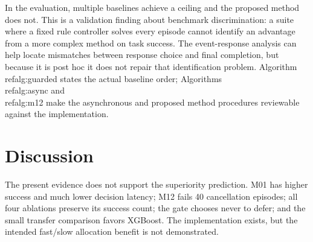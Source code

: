 \documentclass[11pt]{article}
\begin{document}
In the evaluation, multiple baselines achieve a ceiling and the proposed method does not. This is a validation finding about benchmark discrimination: a suite where a fixed rule controller solves every episode cannot identify an advantage from a more complex method on task success. The event-response analysis can help locate mismatches between response choice and final completion, but because it is post hoc it does not repair that identification problem. Algorithm~\\ref{alg:guarded} states the actual baseline order; Algorithms~\\ref{alg:async} and~\\ref{alg:m12} make the asynchronous and proposed method procedures reviewable against the implementation.
\section{Discussion}
The present evidence does not support the superiority prediction. M01 has higher success and much lower decision latency; M12 fails 40 cancellation episodes; all four ablations preserve its success count; the gate chooses never to defer; and the small transfer comparison favors XGBoost. The implementation exists, but the intended fast/slow allocation benefit is not demonstrated.
\end{document}
